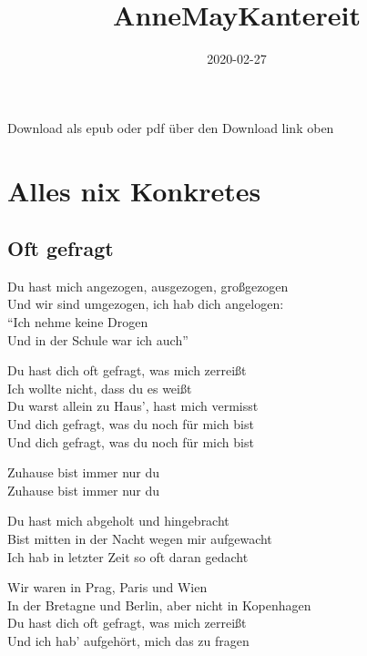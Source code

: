 \documentclass[]{book}
\title{AnneMayKantereit}
\author{}
\date{2020-02-27}
\begin{document}
\maketitle

{
\setcounter{tocdepth}{1}
\tableofcontents
}
\hypertarget{section}{%
\chapter*{}\label{section}}

Download als epub oder pdf über den Download link oben

\hypertarget{alles-nix-konkretes}{%
\chapter{Alles nix Konkretes}\label{alles-nix-konkretes}}

\hypertarget{oft-gefragt}{%
\section{Oft gefragt}\label{oft-gefragt}}

Du hast mich angezogen, ausgezogen, großgezogen\\
Und wir sind umgezogen, ich hab dich angelogen:\\
``Ich nehme keine Drogen\\
Und in der Schule war ich auch''

Du hast dich oft gefragt, was mich zerreißt\\
Ich wollte nicht, dass du es weißt\\
Du warst allein zu Haus', hast mich vermisst\\
Und dich gefragt, was du noch für mich bist\\
Und dich gefragt, was du noch für mich bist

Zuhause bist immer nur du\\
Zuhause bist immer nur du

Du hast mich abgeholt und hingebracht\\
Bist mitten in der Nacht wegen mir aufgewacht\\
Ich hab in letzter Zeit so oft daran gedacht

Wir waren in Prag, Paris und Wien\\
In der Bretagne und Berlin, aber nicht in Kopenhagen\\
Du hast dich oft gefragt, was mich zerreißt\\
Und ich hab' aufgehört, mich das zu fragen
\end{document}
